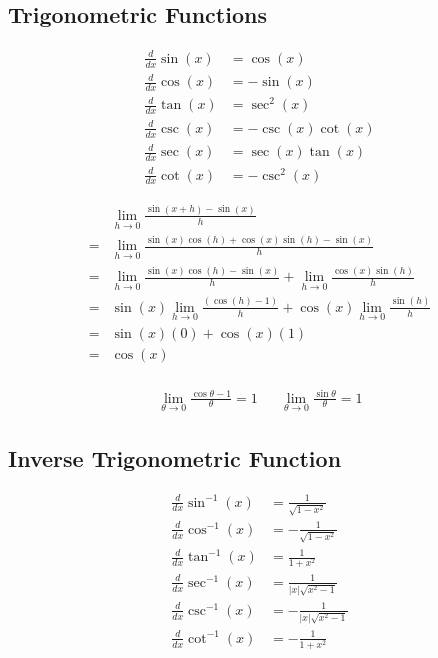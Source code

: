 \documentclass{article}
\theoremstyle{mytheoremstyle}
\theoremstyle{mytheoremstyle}
\theoremstyle{myproblemstyle}
\begin{document}
    \subsection*{Trigonometric Functions}
    \begin{align*}
        \frac{d}{dx} \sin(x) &= \cos(x) \\
        \frac{d}{dx} \cos(x) &= -\sin(x) \\
        \frac{d}{dx} \tan(x) &= \sec^2(x) \\
        \frac{d}{dx} \csc(x) &=  -\csc(x)\cot(x) \\
        \frac{d}{dx} \sec(x) &=  \sec(x)\tan(x) \\
        \frac{d}{dx} \cot(x) &=  -\csc^2(x)
    \end{align*}

    \begin{align*}
        &\lim_{h\to 0} \frac{\sin(x+h) - \sin(x)}{h} \\
        =&\lim_{h\to 0} \frac{\sin(x)\cos(h)+\cos(x)\sin(h)- \sin(x)}{h} \\
        =&\lim_{h\to 0} \frac{\sin(x)\cos(h)-\sin(x)}{h}
            + \lim_{h\to 0} \frac{\cos(x)\sin(h)}{h} \\
        =&\sin(x)\lim_{h\to 0} \frac{(\cos(h)-1)}{h}
            + \cos(x)\lim_{h\to 0} \frac{\sin(h)}{h} \\
        =&\sin(x)(0) + \cos(x)(1) \\
        =&\cos(x) \\
    \end{align*}

    \begin{align*}
        \lim_{\theta\to 0} \frac{\cos\theta-1}{\theta} = 1 &&
        \lim_{\theta\to 0} \frac{\sin\theta}{\theta} = 1
    \end{align*}

    \subsection*{Inverse Trigonometric Function}
    \begin{align*}
        \frac{d}{dx} \sin^{-1}(x) &= \frac{1}{\sqrt{1-x^2}} \\
        \frac{d}{dx} \cos^{-1}(x) &= -\frac{1}{\sqrt{1-x^2}} \\
        \frac{d}{dx} \tan^{-1}(x) &= \frac{1}{1+x^2} \\
        \frac{d}{dx} \sec^{-1}(x) &= \frac{1}{|x|\sqrt{x^2-1}} \\
        \frac{d}{dx} \csc^{-1}(x) &= - \frac{1}{|x|\sqrt{x^2-1}} \\
        \frac{d}{dx} \cot^{-1}(x) &= -\frac{1}{1+x^2}
    \end{align*}
\end{document}
